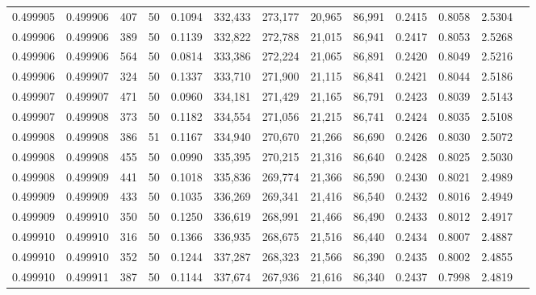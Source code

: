 \begin{tabular}{rrrrrrrrrrrrr}
0.499905 & 0.499906 &   407 &  50 &                                     0.1094 & 332,433 & 273,177 &  20,965 &  86,991 & 0.2415 & 0.8058 & 2.5304 \\
0.499906 & 0.499906 &   389 &  50 &                                     0.1139 & 332,822 & 272,788 &  21,015 &  86,941 & 0.2417 & 0.8053 & 2.5268 \\
0.499906 & 0.499906 &   564 &  50 &                                     0.0814 & 333,386 & 272,224 &  21,065 &  86,891 & 0.2420 & 0.8049 & 2.5216 \\
0.499906 & 0.499907 &   324 &  50 &                                     0.1337 & 333,710 & 271,900 &  21,115 &  86,841 & 0.2421 & 0.8044 & 2.5186 \\
0.499907 & 0.499907 &   471 &  50 &                                     0.0960 & 334,181 & 271,429 &  21,165 &  86,791 & 0.2423 & 0.8039 & 2.5143 \\
0.499907 & 0.499908 &   373 &  50 &                                     0.1182 & 334,554 & 271,056 &  21,215 &  86,741 & 0.2424 & 0.8035 & 2.5108 \\
0.499908 & 0.499908 &   386 &  51 &                                     0.1167 & 334,940 & 270,670 &  21,266 &  86,690 & 0.2426 & 0.8030 & 2.5072 \\
0.499908 & 0.499908 &   455 &  50 &                                     0.0990 & 335,395 & 270,215 &  21,316 &  86,640 & 0.2428 & 0.8025 & 2.5030 \\
0.499908 & 0.499909 &   441 &  50 &                                     0.1018 & 335,836 & 269,774 &  21,366 &  86,590 & 0.2430 & 0.8021 & 2.4989 \\
0.499909 & 0.499909 &   433 &  50 &                                     0.1035 & 336,269 & 269,341 &  21,416 &  86,540 & 0.2432 & 0.8016 & 2.4949 \\
0.499909 & 0.499910 &   350 &  50 &                                     0.1250 & 336,619 & 268,991 &  21,466 &  86,490 & 0.2433 & 0.8012 & 2.4917 \\
0.499910 & 0.499910 &   316 &  50 &                                     0.1366 & 336,935 & 268,675 &  21,516 &  86,440 & 0.2434 & 0.8007 & 2.4887 \\
0.499910 & 0.499910 &   352 &  50 &                                     0.1244 & 337,287 & 268,323 &  21,566 &  86,390 & 0.2435 & 0.8002 & 2.4855 \\
0.499910 & 0.499911 &   387 &  50 &                                     0.1144 & 337,674 & 267,936 &  21,616 &  86,340 & 0.2437 & 0.7998 & 2.4819 \\

\end{tabular}
